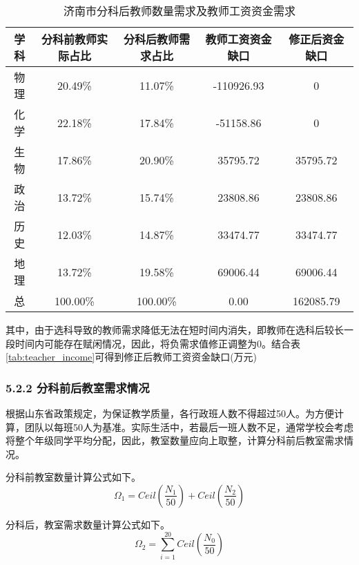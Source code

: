 \documentclass[bwprint]{cumcmthesis}
\begin{document}
\begin{longtable}{ccccc}
	\caption{\label{tab:distance_need}济南市分科后教师数量需求及教师工资资金需求}\\
	\toprule
	学科    & \multicolumn{1}{c}{分科前教师实际占比} & 分科后教师需求占比 & \multicolumn{1}{c}{教师工资资金缺口} & \multicolumn{1}{c}{修正后资金缺口} \\
	\midrule
	物理    & \multicolumn{1}{c}{20.49\%} & 11.07\% & -110926.93  & 0 \\
	化学    & \multicolumn{1}{c}{22.18\%} & 17.84\% & -51158.86  & 0 \\
	生物    & \multicolumn{1}{c}{17.86\%} & 20.90\% & 35795.72  & 35795.72  \\
	政治    & \multicolumn{1}{c}{13.72\%} & 15.74\% & 23808.86  & 23808.86  \\
	历史    & \multicolumn{1}{c}{12.03\%} & 14.87\% & 33474.77  & 33474.77  \\
	地理    & \multicolumn{1}{c}{13.72\%} & 19.58\% & 69006.44  & 69006.44  \\
	\midrule
	总     & 100.00\% & 100.00\% & 0.00  & 162085.79  \\
	\bottomrule
	
\end{longtable}%

其中，由于选科导致的教师需求降低无法在短时间内消失，即教师在选科后较长一段时间内可能存在赋闲情况，因此，将负需求值修正调整为0。结合表\ref{tab:teacher_income}可得到修正后教师工资资金缺口(万元)

\subsubsection{5.2.2 分科前后教室需求情况}

根据山东省政策规定，为保证教学质量，各行政班人数不得超过50人。为方便计算，团队以每班50人为基准。实际生活中，若最后一班人数不足，通常学校会考虑将整个年级同学平均分配，因此，教室数量应向上取整，计算分科前后教室需求情况。

分科前教室数量计算公式如下。
\begin{equation}
\label{equ:before_room}
\Omega_1 = Ceil(\frac{N_1}{50})+Ceil(\frac{N_2}{50})
\end{equation}

分科后，教室需求数量计算公式如下。
\begin{equation}
\label{equ:after_room}
\Omega_2 = \sum\limits_{i=1}^{20}Ceil(\frac{N_0}{50})
\end{equation}
\end{document}
